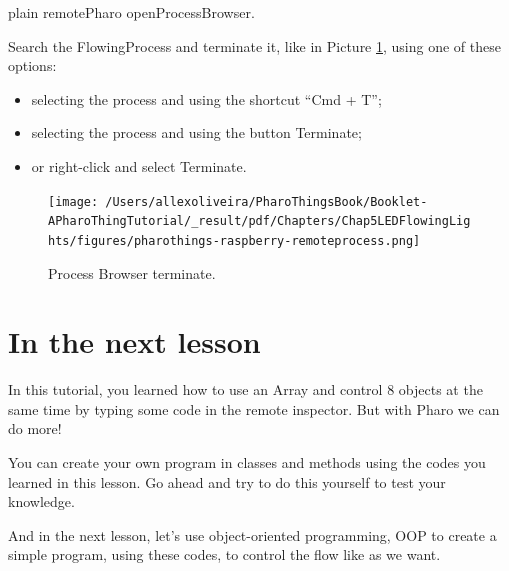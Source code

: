 \documentclass[10pt,twoside,english]{_support/latex/sbabook/sbabook}
\begin{document}
\begin{displaycode}{plain}
remotePharo openProcessBrowser.
\end{displaycode}

Search the FlowingProcess and terminate it, like in Picture \ref{Inspector8LEDsfinal}, using one of these options:

\begin{itemize}
\item selecting the process and using the shortcut “Cmd + T”;
\item selecting the process and using the button Terminate;
\item or right-click and select Terminate.
\end{itemize}


\begin{figure}

\begin{center}
\texttt{[image: /Users/allexoliveira/PharoThingsBook/Booklet-APharoThingTutorial/\_result/pdf/Chapters/Chap5LEDFlowingLights/figures/pharothings-raspberry-remoteprocess.png]}\caption{Process Browser terminate.\label{Inspector8LEDsfinal}}\end{center}
\end{figure}

\section{In the next lesson}
In this tutorial, you learned how to use an Array and control 8 objects at the same time by typing some code in the remote inspector. But with Pharo we can do more!

You can create your own program in classes and methods using the codes you learned in this lesson. Go ahead and try to do this yourself to test your knowledge.

And in the next lesson, let’s use object-oriented programming, OOP to create a simple program, using these codes, to control the flow like as we want.


\backmatter

\end{document}

